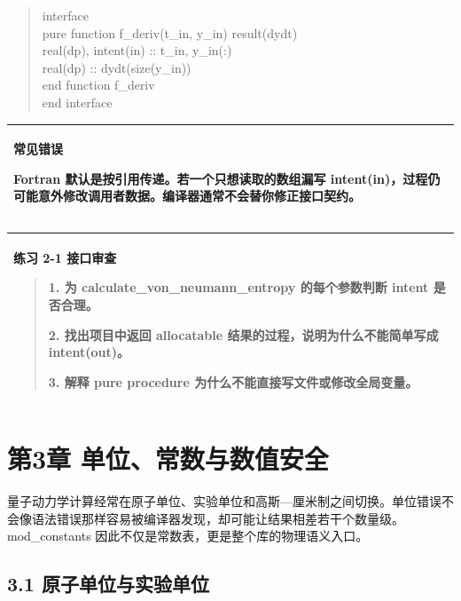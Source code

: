\documentclass[UTF8,openany,11pt,fontset=fandol]{ctexbook}
\begin{document}
\begin{quote}
interface\\
pure function f\_deriv(t\_in, y\_in) result(dydt)\\
real(dp), intent(in) :: t\_in, y\_in(:)\\
real(dp) :: dydt(size(y\_in))\\
end function f\_deriv\\
end interface
\end{quote}

\begin{longtable}[]{@{}l@{}}
\toprule
\endhead
\begin{minipage}[t]{0.97\columnwidth}\raggedright
\textbf{常见错误}

Fortran 默认是按引用传递。若一个只想读取的数组漏写
intent(in)，过程仍可能意外修改调用者数据。编译器通常不会替你修正接口契约。\strut
\end{minipage}\tabularnewline
\bottomrule
\end{longtable}

\begin{longtable}[]{@{}l@{}}
\toprule
\endhead
\begin{minipage}[t]{0.97\columnwidth}\raggedright
\textbf{练习 2-1 接口审查}

\begin{quote}
1. 为 calculate\_von\_neumann\_entropy 的每个参数判断 intent 是否合理。

2. 找出项目中返回 allocatable 结果的过程，说明为什么不能简单写成
intent(out)。

3. 解释 pure procedure 为什么不能直接写文件或修改全局变量。
\end{quote}\strut
\end{minipage}\tabularnewline
\bottomrule
\end{longtable}

\chapter{第3章 单位、常数与数值安全}\label{ux7b2c3ux7ae0-ux5355ux4f4dux5e38ux6570ux4e0eux6570ux503cux5b89ux5168}

量子动力学计算经常在原子单位、实验单位和高斯---厘米制之间切换。单位错误不会像语法错误那样容易被编译器发现，却可能让结果相差若干个数量级。mod\_constants
因此不仅是常数表，更是整个库的物理语义入口。

\section{\texorpdfstring{\textbf{3.1
原子单位与实验单位}}{3.1 原子单位与实验单位}}\label{ux539fux5b50ux5355ux4f4dux4e0eux5b9eux9a8cux5355ux4f4d}
\end{document}
